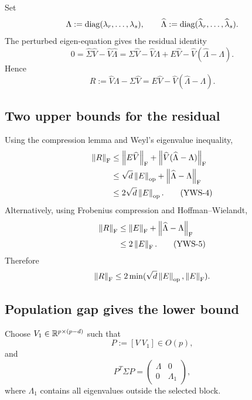 Set
\[
  \Lambda:=\operatorname{diag}(\lambda_r,\dots,\lambda_s),
  \qquad
  \widehat\Lambda:=\operatorname{diag}(\widehat\lambda_r,\dots,\widehat\lambda_s).
\]
The perturbed eigen-equation gives the residual identity
\[
  0=\widehat\Sigma\widehat V-
       \widehat V\widehat\Lambda
   =\Sigma\widehat V-
       \widehat V\Lambda
     +E\widehat V-
       \widehat V(\widehat\Lambda-\Lambda).
\]
Hence
\[
  R:=\widehat V\Lambda-
      \Sigma\widehat V
  =E\widehat V-
    \widehat V(\widehat\Lambda-\Lambda).
\]

\subsection{Two upper bounds for the residual}

Using the compression lemma and Weyl's eigenvalue inequality,
\begin{align}
  \left\lVert R\right\rVert_{\mathrm{F}}
  &\le\left\lVert E\widehat V\right\rVert_{\mathrm{F}}
      +\left\lVert \widehat V(\widehat\Lambda-\Lambda)\right\rVert_{\mathrm{F}}\notag\\
  &\le\sqrt d\left\lVert E\right\rVert_{\mathrm{op}}
      +\left\lVert \widehat\Lambda-\Lambda\right\rVert_{\mathrm{F}}\notag\\
  &\le2\sqrt d\left\lVert E\right\rVert_{\mathrm{op}}. \tag{YWS-4}
\end{align}
Alternatively, using Frobenius compression and Hoffman--Wielandt,
\begin{align}
  \left\lVert R\right\rVert_{\mathrm{F}}
  &\le\left\lVert E\right\rVert_{\mathrm{F}}
      +\left\lVert \widehat\Lambda-\Lambda\right\rVert_{\mathrm{F}}\notag\\
  &\le2\left\lVert E\right\rVert_{\mathrm{F}}. \tag{YWS-5}
\end{align}
Therefore
\[
  \left\lVert R\right\rVert_{\mathrm{F}}
  \le2\min(\sqrt d\left\lVert E\right\rVert_{\mathrm{op}},\left\lVert E\right\rVert_{\mathrm{F}}).
\]

\subsection{Population gap gives the lower bound}

Choose $V_1\in\mathbb{R}^{p\times(p-d)}$ such that
\[
  P:=[V\ V_1]\in O(p),
\]
and
\[
  P^T\Sigma P=
  \begin{pmatrix}
    \Lambda&0\\0&\Lambda_1
  \end{pmatrix},
\]
where $\Lambda_1$ contains all eigenvalues outside the selected block.


